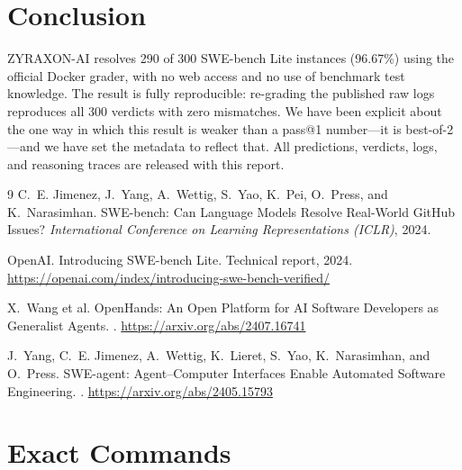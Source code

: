 \documentclass[11pt,a4paper]{article}
\begin{document}
\section{Conclusion}

ZYRAXON-AI resolves 290 of 300 SWE-bench Lite instances (96.67\%) using the
official Docker grader, with no web access and no use of benchmark test knowledge. The
result is fully reproducible: re-grading the published raw logs reproduces all 300
verdicts with zero mismatches. We have been explicit about the one way in which this
result is weaker than a pass@1 number---it is best-of-2---and we have set the metadata to
reflect that. All predictions, verdicts, logs, and reasoning traces are released with
this report.

\begin{thebibliography}{9}
C.~E. Jimenez, J.~Yang, A.~Wettig, S.~Yao, K.~Pei, O.~Press, and K.~Narasimhan.
\newblock SWE-bench: Can Language Models Resolve Real-World GitHub Issues?
\newblock \emph{International Conference on Learning Representations (ICLR)}, 2024.

OpenAI.
\newblock Introducing SWE-bench Lite.
\newblock Technical report, 2024.
\newblock \url{https://openai.com/index/introducing-swe-bench-verified/}

X.~Wang et al.
\newblock OpenHands: An Open Platform for AI Software Developers as Generalist Agents.
. \url{https://arxiv.org/abs/2407.16741}

J.~Yang, C.~E. Jimenez, A.~Wettig, K.~Lieret, S.~Yao, K.~Narasimhan, and O.~Press.
\newblock SWE-agent: Agent--Computer Interfaces Enable Automated Software Engineering.
. \url{https://arxiv.org/abs/2405.15793}
\end{thebibliography}

\appendix
\section{Exact Commands}
\label{sec:commands}
\end{document}
